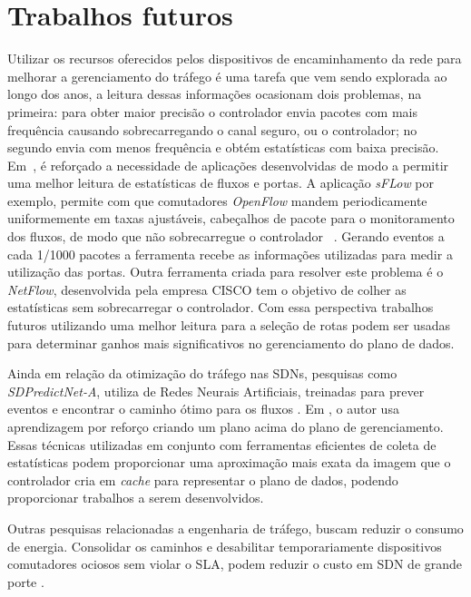 \section{Trabalhos futuros}

Utilizar os recursos oferecidos pelos dispositivos de encaminhamento da rede para melhorar a gerenciamento do tráfego é uma tarefa que vem sendo explorada ao longo dos anos, a leitura dessas informações ocasionam dois problemas, na primeira: para obter maior precisão o controlador envia pacotes com mais frequência causando sobrecarregando o canal seguro, ou o controlador; no segundo envia com menos frequência e obtém estatísticas com baixa precisão. Em~\cite{singh2017estimation}, é reforçado a necessidade de aplicações  desenvolvidas de modo a permitir uma melhor leitura de estatísticas de fluxos e portas. A aplicação \textit{sFLow} por exemplo, permite com que comutadores \textit{OpenFlow} mandem periodicamente uniformemente em taxas ajustáveis, cabeçalhos de pacote para o monitoramento dos fluxos, de modo que não sobrecarregue o controlador ~\cite{mogul2010devoflow}. Gerando eventos a cada 1/1000 pacotes a ferramenta recebe as informações utilizadas para medir a utilização das portas. Outra ferramenta criada para resolver este problema é o \textit{NetFlow}, desenvolvida pela empresa CISCO tem o objetivo de colher as estatísticas sem sobrecarregar o controlador. Com essa perspectiva trabalhos futuros utilizando uma melhor leitura para a seleção de rotas podem ser usadas para determinar ganhos mais significativos no gerenciamento do plano de dados. 

Ainda em relação da otimização do tráfego nas SDNs, pesquisas como \textit{SDPredictNet-A}, utiliza de Redes Neurais Artificiais, treinadas para prever eventos e encontrar o caminho ótimo para os fluxos \cite{sanagavarapu2021sdpredictnet}. Em \cite{casas2020intelligent}, o autor usa aprendizagem por reforço criando um plano acima do plano de gerenciamento. Essas técnicas utilizadas em conjunto com ferramentas eficientes de coleta de estatísticas podem proporcionar uma aproximação mais exata da imagem que o controlador cria em \textit{cache} para representar o plano de dados, podendo proporcionar trabalhos a serem desenvolvidos.

Outras pesquisas relacionadas a engenharia de tráfego, buscam reduzir o consumo de energia. Consolidar os caminhos e desabilitar temporariamente dispositivos comutadores ociosos sem violar o SLA,  podem reduzir o custo em SDN de grande porte \cite{torkzadeh2021energy}. 





